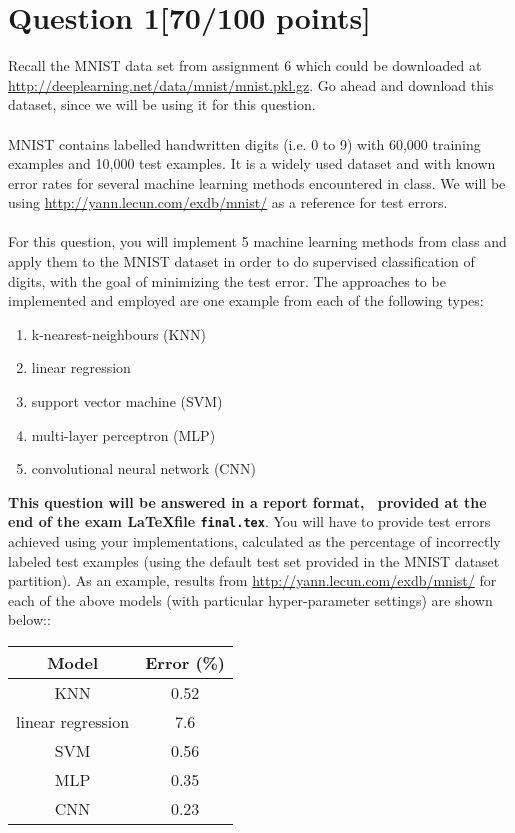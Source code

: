 \documentclass{article}
\begin{document}
\section*{Question 1\hspace{10cm}[70/100 points]}
Recall the MNIST data set from assignment 6 which could be downloaded at \url{http://deeplearning.net/data/mnist/mnist.pkl.gz}. Go ahead and download this dataset, since we will be using it for this question.\\
\\
MNIST contains labelled handwritten digits (i.e. 0 to 9) with 60,000 training examples and 10,000 test examples. It is a widely used dataset and with known error rates for several machine learning methods encountered in class. We will be using \url{http://yann.lecun.com/exdb/mnist/} as a reference for test errors.\\
\\
For this question, you will implement 5 machine learning methods from class and apply them to the MNIST dataset in order to do supervised classification of digits, with the goal of minimizing the test error. The approaches to be implemented and employed are one example from each of the following types:
\begin{enumerate}
    \item k-nearest-neighbours (KNN)
    \item linear regression
    \item support vector machine (SVM)
    \item multi-layer perceptron (MLP)
    \item convolutional neural network (CNN)
\end{enumerate}
\textbf{This question will be answered in a report format,  provided at the end of the exam \LaTeX file \texttt{final.tex}}. You will have to provide test errors achieved using your implementations, calculated as the percentage of incorrectly labeled test examples (using the default test set provided in the MNIST dataset partition). As an example, results from \url{http://yann.lecun.com/exdb/mnist/} for each of the above models (with particular hyper-parameter settings) are shown below::\\
\begin{center}
 \begin{tabular}{|c | c |} 
 \hline
 Model & Error (\%) \\ [0.5ex]
 \hline\hline
 KNN & 0.52 \\
 linear regression & 7.6 \\
 SVM & 0.56 \\
 MLP & 0.35 \\
 CNN & 0.23 \\ 
 \hline 
\end{tabular}
\end{center}
\end{document}
